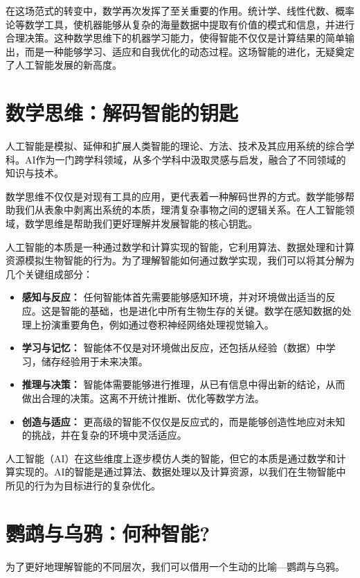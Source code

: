 在这场范式的转变中，数学再次发挥了至关重要的作用。统计学、线性代数、概率论等数学工具，使机器能够从复杂的海量数据中提取有价值的模式和信息，并进行合理决策。这种数学思维下的机器学习能力，使得智能不仅仅是计算结果的简单输出，而是一种能够学习、适应和自我优化的动态过程。这场智能的进化，无疑奠定了人工智能发展的新高度。

\section{数学思维：解码智能的钥匙}

人工智能是模拟、延伸和扩展人类智能的理论、方法、技术及其应用系统的综合学科。AI作为一门跨学科领域，从多个学科中汲取灵感与启发，融合了不同领域的知识与技术。

数学思维不仅仅是对现有工具的应用，更代表着一种解码世界的方式。数学能够帮助我们从表象中剥离出系统的本质，理清复杂事物之间的逻辑关系。在人工智能领域，数学思维是帮助我们更好理解并发展智能的核心钥匙。

人工智能的本质是一种通过数学和计算实现的智能，它利用算法、数据处理和计算资源模拟生物智能的行为。为了理解智能如何通过数学实现，我们可以将其分解为几个关键组成部分：

\begin{itemize}
\item {\bf 感知与反应：} 任何智能体首先需要能够感知环境，并对环境做出适当的反应。这是智能的基础，也是进化中所有生物生存的关键。数学在感知数据的处理上扮演重要角色，例如通过卷积神经网络处理视觉输入。
\item  {\bf 学习与记忆：} 智能体不仅是对环境做出反应，还包括从经验（数据）中学习，储存经验用于未来决策。
\item  {\bf 推理与决策：} 智能体需要能够进行推理，从已有信息中得出新的结论，从而做出合理的决策。这离不开统计推断、优化等数学方法。
\item  {\bf 创造与适应：} 更高级的智能不仅仅是反应式的，而是能够创造性地应对未知的挑战，并在复杂的环境中灵活适应。
\end{itemize}

人工智能（AI）在这些维度上逐步模仿人类的智能，但它的本质是通过数学和计算实现的。AI的智能是通过算法、数据处理以及计算资源，以我们在生物智能中所见的行为为目标进行的复杂优化。

\section{鹦鹉与乌鸦：何种智能?}

为了更好地理解智能的不同层次，我们可以借用一个生动的比喻---鹦鹉与乌鸦。

